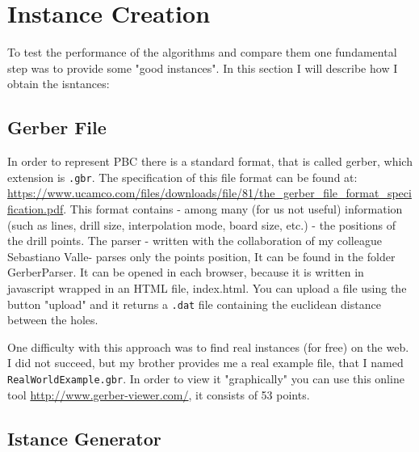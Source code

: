 \section{Instance Creation}
To test the performance of the algorithms and compare them one fundamental step
was to provide some "good instances".
In this section I will describe how I obtain the isntances:
\subsection{Gerber File}

In order to represent PBC there is a standard format, that is called gerber, which extension is \verb|.gbr|.
The specification of this file format can be found at: \url{https://www.ucamco.com/files/downloads/file/81/the_gerber_file_format_specification.pdf}. This format
contains - among many (for us not useful) information (such as lines, drill size, interpolation mode, board size, etc.) -
the positions of the drill points.
The parser - written with the collaboration of my colleague Sebastiano Valle- parses only the points position, It can be found in the folder GerberParser. It can be opened in each browser, because it is written in javascript wrapped in an HTML file, index.html.
You can upload a file using the button "upload" and it returns a \verb|.dat| file containing the euclidean distance between the holes.

One difficulty with this approach was to find real instances (for free) on the web. I did not succeed, but my brother provides me a real example file, that I named
\verb|RealWorldExample.gbr|. In order to view it "graphically" you can use this online tool \url{http://www.gerber-viewer.com/},
it consists of 53 points.

\subsection{Istance Generator}

